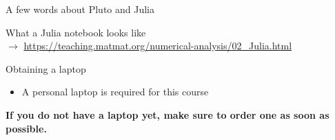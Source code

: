 \begin{frame}{A few words about Pluto and Julia}
    \begin{center}
        \Large{What a Julia notebook looks like} \\[3em]
        {\normalsize\smaller[3]
            \hspace{-1.8cm}
            \hspace{0.2cm}$\rightarrow$\hspace{0.2cm}
            \url{https://teaching.matmat.org/numerical-analysis/02_Julia.html}}
    \end{center}
\end{frame}

\begin{frame}{Obtaining a laptop}
    \begin{itemize}
        \item A \alert{personal laptop is required} for this course
    \end{itemize}
        \vspace{-0.3em}
        \begin{block}{}
            \begin{center}
            \textbf{If you do not have a laptop yet, make sure to \linebreak
                order one as soon as possible.}
            \end{center}
        \end{block}

        \vspace{0.5em}


\end{frame}
